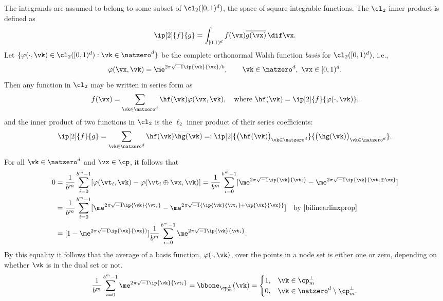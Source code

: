 \documentclass[]{elsarticle}
\theoremstyle{definition}
\newcommand{\cube}{[0,1)^d}
\renewcommand{\bbK}{\natzero^d}
\begin{document}
The integrands are assumed to belong to some subset of $\cl_2(\cube)$, the space of square integrable functions.  The $\cl_2$ inner product is defined as
\[
\ip[2]{f}{g} = \int_{\cube} f(\vx) \overline{g(\vx)} \, \dif \vx.
\]
Let $\{\varphi(\cdot,\vk) \in \cl_2(\cube) : \vk \in \bbK\}$ be the complete orthonormal Walsh function \emph{basis} for $\cl_2(\cube)$, i.e.,
\[
\varphi(\vx,\vk)  = \me^{2 \pi \sqrt{-1} \ip{\vk}{\vx}/b}, \qquad \vk \in \bbK, \ \vx \in \cube.
\]
Then any function in $\cl_2$ may be written in series form as
\begin{equation} \label{Fourierdef}
f(\vx) = \sum_{\vk \in \bbK} \hf(\vk) \varphi(\vx,\vk), \quad \text{where } \hf(\vk) = \ip[2]{f}{\varphi(\cdot,\vk)},
\end{equation}
and the inner product of two functions in $\cl_2$ is the $\ell_2$ inner product of their series coefficients:
\[
\ip[2]{f}{g} = \sum_{\vk \in \bbK} \hf(\vk)\overline{\hg(\vk)} =: \ip[2]{\bigl(\hf(\vk)\bigr)_{\vk \in \bbK}}{\bigl ( \hg(\vk)\bigr )_{\vk \in \bbK}}.
\]

For all $\vk \in \bbK$ and $\vx \in \cp$, it follows that
\begin{align*}
\nonumber
0 & = \frac{1}{b^m} \sum_{i=0}^{b^m-1} [\varphi(\vt_i,\vk) - \varphi(\vt_i \oplus \vx,\vk)]
= \frac{1}{b^m} \sum_{i=0}^{b^m-1} [\me^{2 \pi \sqrt{-1} \ip{\vk}{\vt_i}} - \me^{2 \pi \sqrt{-1} \ip{\vk}{\vt_i \oplus \vx}}]\\
\nonumber
& = \frac{1}{b^m} \sum_{i=0}^{b^m-1} [\me^{2 \pi \sqrt{-1} \ip{\vk}{\vt_i}} - \me^{2 \pi \sqrt{-1} \{\ip{\vk}{\vt_i}+\ip{\vk}{\vx}\}}] \quad \text{by } \eqref{bilinearlinxprop}\\
\label{sumeq}
& = [1 - \me^{2 \pi \sqrt{-1} \ip{\vk}{\vx})}] \frac{1}{b^m} \sum_{i=0}^{b^m-1}  \me^{2 \pi \sqrt{-1} \ip{\vk}{\vt_i}}.
\end{align*}
By this equality it follows that the average of a basis function, $\varphi(\cdot,\vk)$, over the points in a node set is either one or zero, depending on whether $\vk$ is in the dual set or not.
\begin{equation*}
\frac{1}{b^m} \sum_{i=0}^{b^m-1}  \me^{2 \pi \sqrt{-1} \ip{\vk}{\vt_i}} = \bbone_{\cp_m^{\perp}}(\vk) = \begin{cases} 1 , & \vk \in \cp_m^{\perp}\\
 0,  & \vk \in \bbK \setminus \cp_m^{\perp}.
 \end{cases}
\end{equation*}
\end{document}
